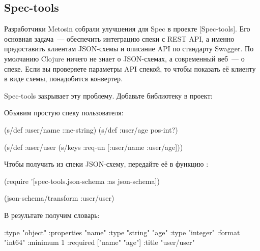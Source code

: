 
\subsection{Spec-tools}

Разработчики Metosin собрали улучшения для Spec в проекте
[Spec-tools]. Его
основная задача~--- обеспечить интеграцию спеки с REST API, а именно
предоставить клиентам JSON-схемы и описание API по стандарту Swagger. По
умолчанию Clojure ничего не знает о JSON-схемах, а современный веб~--- о
спеке. Если вы проверяете параметры API спекой, то чтобы показать её клиенту в
виде схемы, понадобится конвертер.

Spec-tools закрывает эту проблему. Добавьте библиотеку в проект:

\begin{clojure}
\end{clojure}

Объявим простую спеку пользователя:

\iflarge\vspace{15mm}\pagebreak[4]\fi

\begin{clojure}
(s/def :user/name ::ne-string)
(s/def :user/age pos-int?)

(s/def :user/user
  (s/keys :req-un [:user/name :user/age]))
\end{clojure}

Чтобы получить из спеки JSON-схему, передайте её в функцию :

\begin{clojure}
(require '[spec-tools.json-schema
           :as json-schema])

(json-schema/transform :user/user)
\end{clojure}

В результате получим словарь:

\ifafive\vspace{15mm}\pagebreak[4]\fi

\begin{clojure/lines}
{:type "object"
 :properties
 {"name" {:type "string"}
  "age" {:type "integer"
         :format "int64"
         :minimum 1}}
 :required ["name" "age"]
 :title "user/user"}
\end{clojure/lines}

